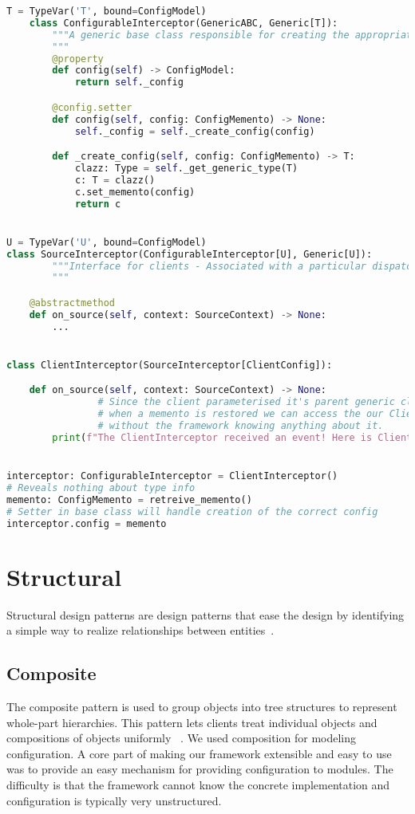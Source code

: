 \begin{lstlisting}[language=Python]
	T = TypeVar('T', bound=ConfigModel)
	class ConfigurableInterceptor(GenericABC, Generic[T]):
	    """A generic base class responsible for creating the appropriate ConfigModel for interceptors.
	    """
	    @property
	    def config(self) -> ConfigModel:
	        return self._config

	    @config.setter
	    def config(self, config: ConfigMemento) -> None:
	        self._config = self._create_config(config)

	    def _create_config(self, config: ConfigMemento) -> T:
	        clazz: Type = self._get_generic_type(T)
	        c: T = clazz()
	        c.set_memento(config)
	        return c


U = TypeVar('U', bound=ConfigModel)
class SourceInterceptor(ConfigurableInterceptor[U], Generic[U]):
		"""Interface for clients - Associated with a particular dispatcher/interception point.
		"""

    @abstractmethod
    def on_source(self, context: SourceContext) -> None:
        ...


class ClientInterceptor(SourceInterceptor[ClientConfig]):

    def on_source(self, context: SourceContext) -> None:
				# Since the client parameterised it's parent generic class,
				# when a memento is restored we can access the our ClientConfig
				# without the framework knowing anything about it.
        print(f"The ClientInterceptor received an event! Here is ClientConfig '{self.config}'")


interceptor: ConfigurableInterceptor = ClientInterceptor()
# Reveals nothing about type info
memento: ConfigMemento = retreive_memento()
# Setter in base class will handle creation of the correct config
interceptor.config = memento

\end{lstlisting}

\section{Structural}
Structural design patterns are design patterns that ease the design by identifying a simple way to
realize relationships between entities~\citep{OODesign}.


\subsection{Composite}
The composite pattern is used to group objects into tree structures to represent whole-part hierarchies.
This pattern lets clients treat individual objects and compositions of objects uniformly ~\citep{sourcemaking}.
We used composition for modeling configuration. A core part of making our framework extensible and easy to use
was to provide an easy mechanism for providing configuration to modules. The difficulty is that the framework
cannot know the concrete implementation and configuration is typically very unstructured.


